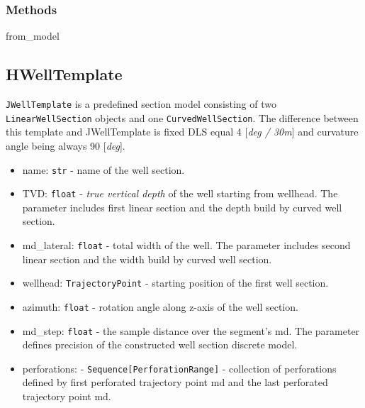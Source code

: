 \subsubsection{Methods}
\begin{description}
	\item[\colorbox{gray!20}{from\_model}] \hfill
\end{description}

\subsection{HWellTemplate}
\texttt{JWellTemplate} is a predefined section model consisting of two \texttt{LinearWellSection} objects and one \texttt{CurvedWellSection}. The difference between this template and JWellTemplate is fixed DLS equal 4 [\textit{deg / 30m}] and curvature angle being always 90 [\textit{deg}].
\begin{itemize}
	\item  \colorbox{gray!20}{name:} \texttt{str} - name of the well section.
	\item  \colorbox{gray!20}{TVD:} \texttt{float} - \textit{true vertical depth} of the well starting from wellhead. The parameter includes first linear section and the depth build by curved well section.
	\item  \colorbox{gray!20}{md\_lateral:} \texttt{float} - total width of the well. The parameter includes second linear section and the width build by curved well section.
	\item  \colorbox{gray!20}{wellhead:} \texttt{TrajectoryPoint} - starting position of the first well section.
	\item  \colorbox{gray!20}{azimuth:} \texttt{float} - rotation angle along z-axis of the well section.
	\item  \colorbox{gray!20}{md\_step:} \texttt{float} - the sample distance over the segment's md. The parameter defines precision of the constructed well section discrete model.
	\item  \colorbox{gray!20}{perforations:} -  \texttt{Sequence[PerforationRange]} - collection of perforations defined by first perforated trajectory point md and the last perforated trajectory point md.

\end{itemize}
